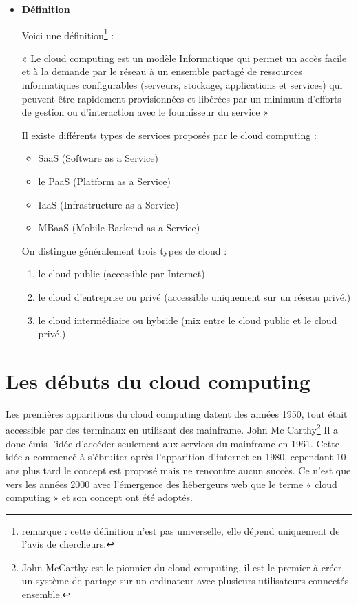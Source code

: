 \documentclass[a4 paper, 12 pt]{article}
\begin{document}
\begin{itemize}[label=\textbullet] 

\item \textbf{Définition}
\newline 

Voici une définition\footnote{remarque : cette définition n'est pas universelle, elle dépend uniquement de l'avis de chercheurs.} :

« Le cloud computing est un modèle Informatique qui permet un accès facile et à la demande par le réseau à un ensemble partagé de ressources informatiques configurables (serveurs, stockage, applications et services) qui peuvent être rapidement provisionnées et libérées par un minimum d’efforts de gestion ou d’interaction avec le fournisseur du service » \cite{barkat2018composition}  \newline


Il existe différents types de services proposés par le cloud computing :
\begin{itemize}
\item SaaS (Software as a Service)
\item le PaaS (Platform as a Service) 
\item IaaS (Infrastructure as a Service)
\item MBaaS (Mobile Backend as a Service)
\end{itemize}
\vspace{1cm}


On distingue généralement trois types de cloud :
  
\begin{enumerate}
\item le cloud public (accessible par Internet)
\item le cloud d'entreprise ou privé (accessible uniquement sur un réseau privé.) 
\item le cloud intermédiaire ou hybride (mix entre le cloud public et le cloud privé.)
\end{enumerate}

\end{itemize}


\section{Les débuts du cloud computing}

Les premières apparitions du cloud computing datent des années 1950, tout était accessible par des terminaux en utilisant des mainframe. John Mc Carthy\footnote{John McCarthy est le pionnier du cloud computing, il est le premier à créer un système de partage sur un ordinateur avec plusieurs utilisateurs connectés ensemble.} Il a donc émis l’idée d’accéder seulement aux services du mainframe en 1961. 
Cette idée a commencé à s’ébruiter après l’apparition d’internet en 1980, cependant 10 ans plus tard le concept est proposé mais ne rencontre aucun succès. Ce n’est que vers les années 2000 avec l’émergence des hébergeurs web que le terme « cloud computing » \cite{WikiHistoire} et son concept ont été adoptés.  \newline 
\end{document}
